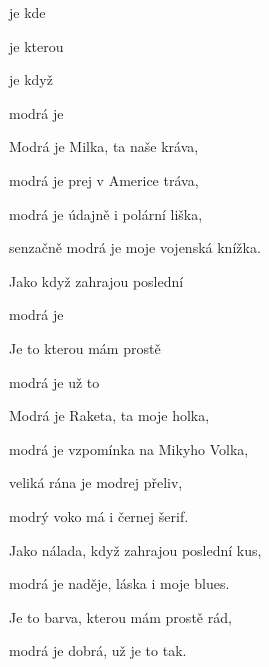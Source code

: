 

      

\zs
{} je  kde  

 je  kterou 

 je  když  

modrá je   
\ks

\zs
Modrá je Milka, ta naše kráva,

modrá je prej v Americe tráva,

modrá je údajně i polární liška,

senzačně modrá je moje vojenská knížka.
\ks

\zr
Jako  když zahrajou poslední 

modrá je    

Je to  kterou mám prostě 

modrá je  už  to 
\kr

\zs
Modrá je Raketa, ta moje holka,

modrá je vzpomínka na Mikyho Volka,

veliká rána je modrej přeliv,

modrý voko má i černej šerif.
\ks

\zs
Jako nálada, když zahrajou poslední kus,

modrá je naděje, láska i moje blues.

Je to barva, kterou mám prostě rád,

modrá je dobrá, už je to tak.
\ks

         

\kp





